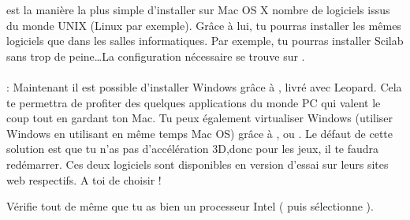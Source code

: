 


\noindent{} est la manière la plus simple d'installer sur Mac OS X nombre de logiciels issus du monde UNIX (Linux par exemple). Grâce à lui, tu pourras installer les mêmes logiciels que dans les salles informatiques. Par exemple, tu pourras installer Scilab sans trop de peine\dots La configuration nécessaire se trouve sur . \\ \\

\noindent {} : Maintenant il est possible d'installer Windows grâce à , livré avec Leopard. Cela te permettra de profiter des quelques applications du monde PC qui valent le coup tout en gardant ton Mac. Tu peux également virtualiser Windows (utiliser Windows en utilisant en même temps Mac OS) grâce à ,  ou . Le  défaut de cette solution est que tu n'as pas d'accélération 3D,donc pour les jeux, il te faudra redémarrer. Ces deux logiciels sont disponibles en version d'essai sur leurs sites web respectifs. A toi de choisir !

Vérifie tout de même que tu as bien un processeur Intel ( puis sélectionne ).
